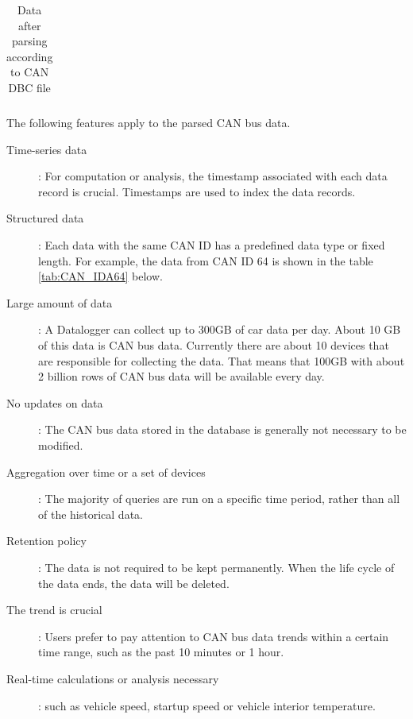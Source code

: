 \begin{table}[hbt!]
{\begin{tabular}{@{}ccl@{}}
\end{tabular}%
}
	\caption{Data after parsing according to CAN DBC file}
	\label{tab:parsing_canbus}
\end{table}

The following features apply to the parsed CAN bus data.

\begin{description}
\item[Time-series data]: For computation or analysis, the timestamp associated with each data record is crucial. Timestamps are used to index the data records\cite{taos_data}.
\item[Structured data]: Each data with the same CAN ID has a predefined data type or fixed length. For example, the data from CAN ID 64 is shown in the table \ref{tab:CAN_IDA64} below.
\item[Large amount of data]: A Datalogger can collect up to 300GB of car data per day. About 10 GB of this data is CAN bus data. Currently there are about 10 devices that are responsible for collecting the data. That means that 100GB with about 2 billion rows of CAN bus data will be available every day.
\item[No updates on data]: The CAN bus data stored in the database is generally not necessary to be modified.
\item[Aggregation over time or a set of devices]: The majority of queries are run on a specific time period, rather than all of the historical data.
\item[Retention policy]: The data is not required to be kept permanently. When the life cycle of the data ends, the data will be deleted.
\item[The trend is crucial]: Users prefer to pay attention to CAN bus data trends within a certain time range, such as the past 10 minutes or 1 hour.
\item[Real-time calculations or analysis necessary]: such as vehicle speed, startup speed or vehicle interior temperature.
\end{description}

\begin{table}[hbt!]
\centering
{}
\caption{Data with CAN ID 64}
\label{tab:CAN_IDA64}
\end{table}


